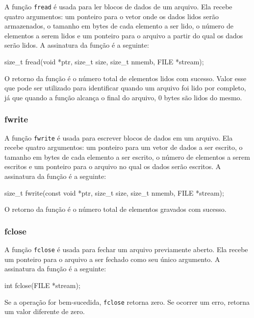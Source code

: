 A função \texttt{fread} é usada para ler blocos de dados de um arquivo. Ela 
recebe quatro argumentos: um ponteiro para o vetor onde os dados lidos serão 
armazenados, o tamanho em bytes de cada elemento a ser lido, o número de 
elementos a serem lidos e um ponteiro para o arquivo a partir do qual os dados 
serão lidos. A assinatura da função é a seguinte:

\begin{excode}
    size_t fread(void *ptr, size_t size, size_t nmemb, FILE *stream);
\end{excode}

O retorno da função é o número total de elementos lidos com sucesso. Valor esse 
que pode ser utilizado para identificar quando um arquivo foi lido por completo, 
já que quando a função alcança o final do arquivo, 0 bytes são lidos do mesmo.

\subsubsection{fwrite}

A função \texttt{fwrite} é usada para escrever blocos de dados em um arquivo. 
Ela recebe quatro argumentos: um ponteiro para um vetor de dados a ser escrito, 
o tamanho em bytes de cada elemento a ser escrito, o número de elementos a 
serem escritos e um ponteiro para o arquivo no qual os dados serão escritos. A 
assinatura da função é a seguinte:

\begin{excode}
    size_t fwrite(const void *ptr, size_t size, size_t nmemb, FILE *stream);
\end{excode}

O retorno da função é o número total de elementos gravados com sucesso.

\subsubsection{fclose}

A função \texttt{fclose} é usada para fechar um arquivo previamente aberto. Ela 
recebe um ponteiro para o arquivo a ser fechado como seu único argumento. 
A assinatura da função é a seguinte:

\begin{excode}
    int fclose(FILE *stream);
\end{excode}

Se a operação for bem-sucedida, \texttt{fclose} retorna zero. Se ocorrer um 
erro, retorna um valor diferente de zero.

